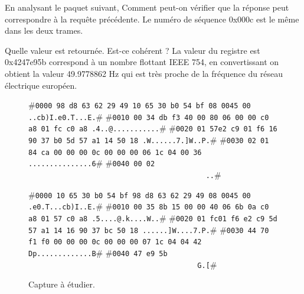 {En analysant le paquet suivant, 
Comment peut-on vérifier que la réponse peut correspondre à la requête précédente.}
{Le numéro de séquence 0x000c est le même dans les deux trames.}


{Quelle valeur est retournée. Est-ce cohérent ?}
{La valeur du registre est 0x4247e95b correspond à un nombre flottant IEEE 754, en convertissant on obtient la valeur 49.9778862 Hz qui est très proche de la fréquence du réseau électrique européen.}

\begin{figure}[tbp]

\begin{termc}[backgroundcolor=\color{backcolour}, escapechar=#]
#\texttt{\small{0000  \colorbox{purple!50}{98 d8 63 62 29 49 10 65 30 b0 54 bf 08 00}\colorbox{blue!30}{45 00}   ..cb)I.e0.T...E.}}#
#\texttt{\small{0010  \colorbox{blue!30}{00 34 db f3 40 00 80 06 00 00 c0 a8 01 fc c0 a8}   .4..@...........}}#
#\texttt{\small{0020  \colorbox{blue!30}{01 57}\colorbox{red!30}{e2 c9 01 f6 16 90 37 b0 5d 57 a1 14 50 18}   .W......7.]W..P.}}#
#\texttt{\small{0030  \colorbox{red!30}{02 01 84 ca 00 00} 00 0c 00 00 00 06 1c 04 00 36   ...............6}}#
#\texttt{\small{0040  00 02 \ \ \ \ \ \ \ \ \ \ \ \ \ \ \ \ \ \ \ \ \ \ \ \ \ \ \ \ \ \ \ \ \ \ \ \ \ \ \ \ \ \  ..}}#
                           
\end{termc}

\begin{termc}[backgroundcolor=\color{backcolour}, escapechar=#]
#\texttt{\small{0000  \colorbox{purple!50}{10 65 30 b0 54 bf 98 d8 63 62 29 49 08 00}\colorbox{blue!30}{45 00}   .e0.T...cb)I..E.}}#
#\texttt{\small{0010  \colorbox{blue!30}{00 35 8b 15 00 00 40 06 6b 0a c0 a8 01 57 c0 a8}   .5....@.k....W..}}#
#\texttt{\small{0020  \colorbox{blue!30}{01 fc}\colorbox{red!30}{01 f6 e2 c9 5d 57 a1 14 16 90 37 bc 50 18}   ......]W....7.P.}}#
#\texttt{\small{0030  \colorbox{red!30}{44 70 f1 f0 00 00} 00 0c 00 00 00 07 1c 04 04 42   Dp.............B}}#
#\texttt{\small{0040  47 e9 5b \ \ \ \ \ \ \ \ \ \ \ \ \ \ \ \ \ \ \ \ \ \ \ \ \ \ \ \ \ \ \ \ \ \ \ \ \ \ \ \  G.[}}#
                           
\end{termc}
\caption{Capture à étudier.}
\label{fig-exo-ws}
\end{figure}